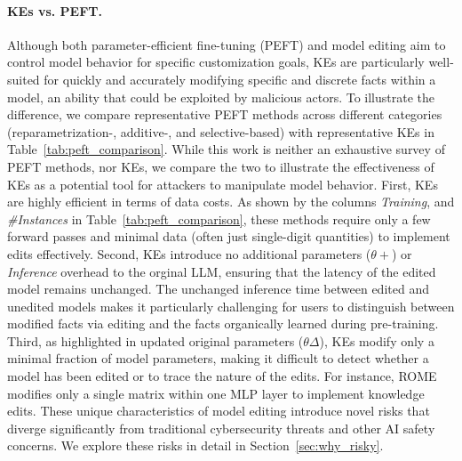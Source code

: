 \paragraph{KEs vs. PEFT.} Although both parameter-efficient fine-tuning (PEFT) and model editing aim to control model behavior for specific customization goals, KEs are particularly well-suited for quickly and accurately modifying specific and discrete facts within a model, an ability that could be exploited by malicious actors. 
To illustrate the difference, we compare representative PEFT methods across different categories (reparametrization-, additive-, and selective-based) with representative KEs in Table~\ref{tab:peft_comparison}.
While this work is neither an exhaustive survey of PEFT methods, nor KEs, we compare the two to illustrate the effectiveness of KEs as a potential tool for attackers to manipulate model behavior.
First, KEs are highly efficient in terms of data costs. As shown by the columns \textit{Training}, and \textit{\#Instances} in Table~\ref{tab:peft_comparison}, these methods require only a few forward passes and minimal data (often just single-digit quantities) to implement edits effectively.
Second, KEs introduce no additional parameters ($\theta+$) or \textit{Inference} overhead to the orginal LLM, ensuring that the latency of the edited model remains unchanged. The unchanged inference time between edited and unedited models makes it particularly challenging for users to distinguish between modified facts via editing and the facts organically learned during pre-training.
Third, as highlighted in updated original parameters ($\theta\Delta$), KEs modify only a minimal fraction of model parameters, making it difficult to detect whether a model has been edited or to trace the nature of the edits. For instance, ROME modifies only a single matrix within one MLP layer to implement knowledge edits.
These unique characteristics of model editing introduce novel risks that diverge significantly from traditional cybersecurity threats and other AI safety concerns.%
We explore these risks in detail in Section~\ref{sec:why_risky}.




